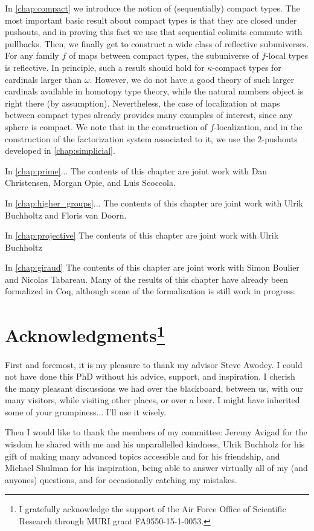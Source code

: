 In \cref{chap:compact} we introduce the notion of (sequentially) compact types. The most important basic result about compact types is that they are closed under pushouts, and in proving this fact we use that sequential colimits commute with pullbacks.
Then, we finally get to construct a wide class of reflective subuniverses. For any family $f$ of maps between compact types, the subuniverse of $f$-local types is reflective. In principle, such a result should hold for $\kappa$-compact types for cardinals larger than $\omega$. However, we do not have a good theory of such larger cardinals available in homotopy type theory, while the natural numbers object is right there (by assumption). Nevertheless, the case of localization at maps between compact types already provides many examples of interest, since any sphere is compact. We note that in the construction of $f$-localization, and in the construction of the factorization system associated to it, we use the $2$-pushouts developed in \cref{chap:simplicial}.

In \cref{chap:prime}...
The contents of this chapter are joint work with Dan Christensen, Morgan Opie, and Luis Scoccola.

In \cref{chap:higher_groups}...
The contents of this chapter are joint work with Ulrik Buchholtz and Floris van Doorn.

In \cref{chap:projective}
The contents of this chapter are joint work with Ulrik Buchholtz

In \cref{chap:giraud}
The contents of this chapter are joint work with Simon Boulier and Nicolas Tabareau. Many of the results of this chapter have already been formalized in Coq, although some of the formalization is still work in progress.


\section{Acknowledgments\footnote{I gratefully acknowledge the support of the Air Force Office of Scientific Research through MURI grant FA9550-15-1-0053.}}
First and foremost, it is my pleasure to thank my advisor Steve Awodey. I could not have done this PhD without his advice, support, and inspiration. I cherish the many pleasant discussions we had over the blackboard, between us, with our many visitors, while visiting other places, or over a beer. I might have inherited some of your grumpiness... I'll use it wisely.

Then I would like to thank the members of my committee: Jeremy Avigad for the wisdom he shared with me and his unparallelled kindness, Ulrik Buchholz for his gift of making many advanced topics accessible and for his friendship, and Michael Shulman for his inspiration, being able to answer virtually all of my (and anyones) questions, and for occasionally catching my mistakes.

